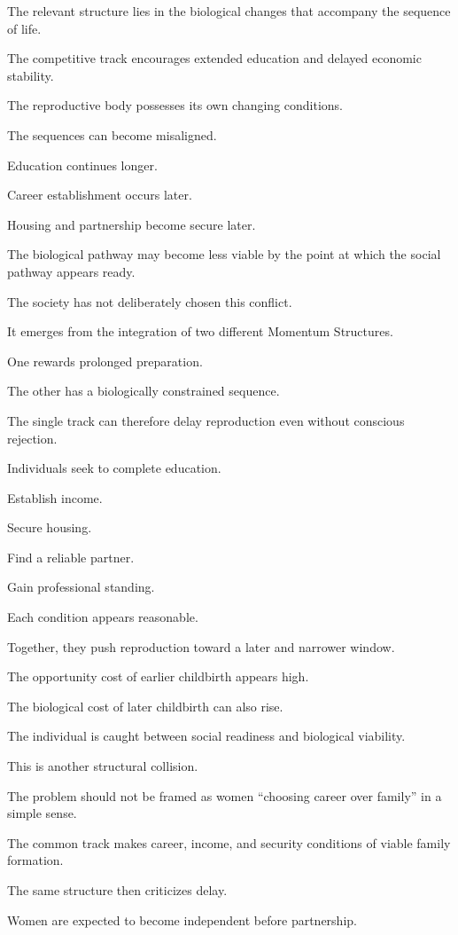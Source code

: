 The relevant structure lies in the biological changes that accompany the sequence of life.

The competitive track encourages extended education and delayed economic stability.

The reproductive body possesses its own changing conditions.

The sequences can become misaligned.

Education continues longer.

Career establishment occurs later.

Housing and partnership become secure later.

The biological pathway may become less viable by the point at which the social pathway appears ready.

The society has not deliberately chosen this conflict.

It emerges from the integration of two different Momentum Structures.

One rewards prolonged preparation.

The other has a biologically constrained sequence.

The single track can therefore delay reproduction even without conscious rejection.

Individuals seek to complete education.

Establish income.

Secure housing.

Find a reliable partner.

Gain professional standing.

Each condition appears reasonable.

Together, they push reproduction toward a later and narrower window.

The opportunity cost of earlier childbirth appears high.

The biological cost of later childbirth can also rise.

The individual is caught between social readiness and biological viability.

This is another structural collision.

The problem should not be framed as women “choosing career over family” in a simple sense.

The common track makes career, income, and security conditions of viable family formation.

The same structure then criticizes delay.

Women are expected to become independent before partnership.

